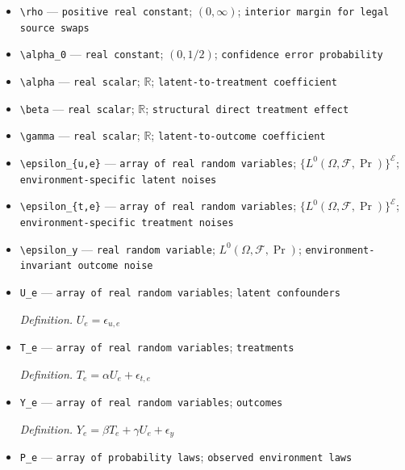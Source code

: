 \documentclass{article}
\begin{document}
\begin{itemize}
  \item \texttt{\textbackslash{}\allowbreak{}rho} --- \texttt{positive real constant}; \((0,\infty)\); \texttt{interior margin for legal source swaps}
  \item \texttt{\textbackslash{}\allowbreak{}alpha\_\allowbreak{}0} --- \texttt{real constant}; \((0,1/2)\); \texttt{confidence error probability}
  \item \texttt{\textbackslash{}\allowbreak{}alpha} --- \texttt{real scalar}; \(\mathbb R\); \texttt{latent-\allowbreak{}to-\allowbreak{}treatment coefficient}
  \item \texttt{\textbackslash{}\allowbreak{}beta} --- \texttt{real scalar}; \(\mathbb R\); \texttt{structural direct treatment effect}
  \item \texttt{\textbackslash{}\allowbreak{}gamma} --- \texttt{real scalar}; \(\mathbb R\); \texttt{latent-\allowbreak{}to-\allowbreak{}outcome coefficient}
  \item \texttt{\textbackslash{}\allowbreak{}epsilon\_\allowbreak{}\{u,\allowbreak{}e\}\allowbreak{}} --- \texttt{array of real random variables}; \(\{L^0(\Omega,\mathcal F,\Pr)\}^{\mathcal E}\); \texttt{environment-\allowbreak{}specific latent noises}
  \item \texttt{\textbackslash{}\allowbreak{}epsilon\_\allowbreak{}\{t,\allowbreak{}e\}\allowbreak{}} --- \texttt{array of real random variables}; \(\{L^0(\Omega,\mathcal F,\Pr)\}^{\mathcal E}\); \texttt{environment-\allowbreak{}specific treatment noises}
  \item \texttt{\textbackslash{}\allowbreak{}epsilon\_\allowbreak{}y} --- \texttt{real random variable}; \(L^0(\Omega,\mathcal F,\Pr)\); \texttt{environment-\allowbreak{}invariant outcome noise}
  \item \texttt{U\_\allowbreak{}e} --- \texttt{array of real random variables}; \texttt{latent confounders}
  \par\smallskip\noindent\emph{Definition.} \(U_e=\epsilon_{u,e}\)
  \item \texttt{T\_\allowbreak{}e} --- \texttt{array of real random variables}; \texttt{treatments}
  \par\smallskip\noindent\emph{Definition.} \(T_e=\alpha U_e+\epsilon_{t,e}\)
  \item \texttt{Y\_\allowbreak{}e} --- \texttt{array of real random variables}; \texttt{outcomes}
  \par\smallskip\noindent\emph{Definition.} \(Y_e=\beta T_e+\gamma U_e+\epsilon_y\)
  \item \texttt{P\_\allowbreak{}e} --- \texttt{array of probability laws}; \texttt{observed environment laws}

\end{itemize}
\end{document}
